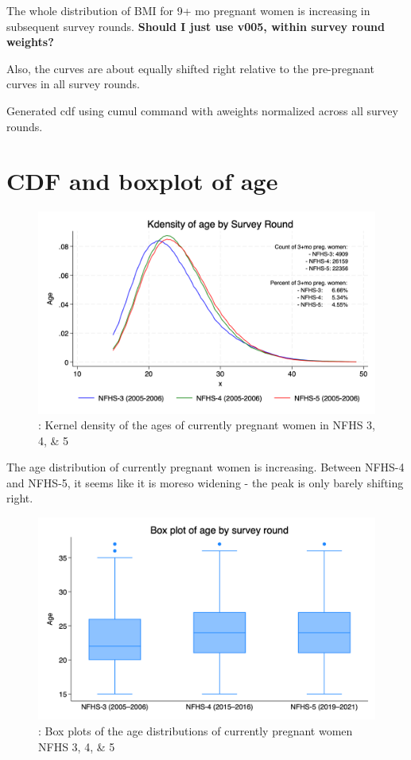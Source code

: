 \documentclass{article}
\begin{document}
The whole distribution of BMI for 9+ mo pregnant women is increasing in subsequent survey rounds. \textbf{Should I just use v005, within survey round weights?}

Also, the curves are about equally shifted right relative to the pre-pregnant curves in all survey rounds. 

Generated cdf using cumul command with aweights normalized across all survey rounds.

\section{CDF and boxplot of age}

\begin{figure}[H]
    \centering
    \includegraphics[width=\textwidth]{figures/kdensities ages.png}
    \caption{: Kernel density of the ages of currently pregnant women in NFHS 3, 4, \& 5}
\end{figure}

The age distribution of currently pregnant women is increasing. Between NFHS-4 and NFHS-5, it seems like it is moreso widening - the peak is only barely shifting right. 

\begin{figure}[H]
    \centering
    \includegraphics[width=\textwidth]{figures/boxplots ages.png}
    \caption{: Box plots of the age distributions of currently pregnant women NFHS 3, 4, \& 5}
\end{figure}
\end{document}
